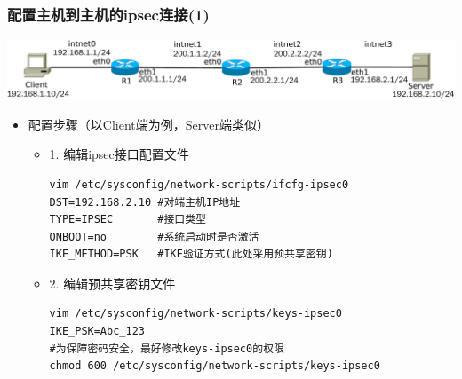 \documentclass[xcolor=svgnames,presentation]{beamer}
\begin{document}
\begin{frame}[fragile]
\frametitle{配置主机到主机的ipsec连接(1)}
\label{sec-4-10}

\includegraphics[width=.9\linewidth]{img/vpnlab.pdf}
\begin{itemize}

\item 配置步骤（以Client端为例，Server端类似）
\label{sec-4-10-1}%
\begin{itemize}

\item 1. 编辑ipsec接口配置文件\\
\label{sec-4-10-1-1}%
\begin{verbatim}
vim /etc/sysconfig/network-scripts/ifcfg-ipsec0
DST=192.168.2.10 #对端主机IP地址
TYPE=IPSEC       #接口类型
ONBOOT=no        #系统启动时是否激活
IKE_METHOD=PSK   #IKE验证方式(此处采用预共享密钥)
\end{verbatim}

\item 2. 编辑预共享密钥文件\\
\label{sec-4-10-1-2}%
\begin{verbatim}
vim /etc/sysconfig/network-scripts/keys-ipsec0
IKE_PSK=Abc_123
#为保障密码安全，最好修改keys-ipsec0的权限
chmod 600 /etc/sysconfig/network-scripts/keys-ipsec0
\end{verbatim}
\end{itemize} %
\end{itemize} %
\end{frame}
\end{document}
